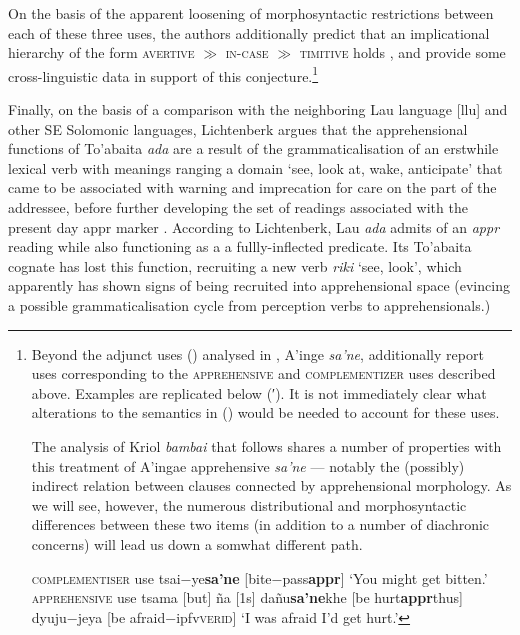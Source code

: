  On the basis of the apparent loosening of morphosyntactic restrictions between each of these three uses, the authors additionally predict that an implicational hierarchy of the form \textsc{avertive $\gg$ in-case $ \gg $ timitive} holds \citeyearpar[386-87]{AnderBois2020}, and provide some cross-linguistic data in support of this conjecture.\footnote{Beyond the adjunct uses () analysed in \citealt{AnderBois2020}, A'inge \textit{\textdblhyphen sa'ne}, \citet{Dabkowski} additionally report uses corresponding to the \textsc{apprehensive} and \textsc{complementizer} uses described above. Examples are replicated below (′). It is not immediately clear what alterations to the semantics in () would be needed to account for these uses.
	
The analysis of Kriol \textit{bambai} that follows shares a number of properties with this treatment of A'ingae apprehensive \textdblhyphen\textit{sa'ne} --- notably the (possibly) indirect relation between clauses connected by apprehensional morphology. As we will see, however, the numerous distributional and morphosyntactic differences between these two items (in addition to a number of diachronic concerns) will lead us down a somwhat different path.

\pex[glstyle=nlevel,aboveglftskip=.2ex,belowglpreambleskip=0ex,belowexskip=0ex,aboveexskip=1ex,exno=\getref{con}′]   
\a[label=d]\begingl\glpreamble\textsc{complementiser} use \endpreamble
tsai−ye\textdblhyphen\textbf{sa’ne} [bite−pass\textdblhyphen\textbf{\gls{appr}}]
\glft`You might get bitten.'
\endgl
\a[label=e]\begingl\glpreamble \textsc{apprehensive} use \endpreamble
tsama [but]
ña [1s]
dañu\textdblhyphen\textbf{sa'ne}\textdblhyphen khe [be hurt\textdblhyphen\textbf{\gls{appr}}\textdblhyphen thus]
dyuju−je\textdblhyphen ya [be afraid−\gls{ipfv}\textdblhyphen\textsc{verid}]
\glft`I was afraid I'd get hurt.'%
\endgl
\xe}



Finally, on the basis of a comparison with the neighboring Lau language [\gls{llu}] and other SE Solomonic languages, Lichtenberk argues that the apprehensional functions of To'abaita \textit{ada} are a result of the grammaticalisation of an erstwhile lexical verb with meanings ranging a domain `see, look at, wake, anticipate' that came to be associated with warning and imprecation for care on the part of the addressee, before further developing the set of readings associated with the present day {\sc appr} marker \citeyearpar[303-4]{Lichtenberk1995}. According to Lichtenberk, Lau \textit{ada} admits of an \textsl{appr} reading while also functioning as a a fullly-inflected predicate. Its To'abaita cognate has lost this function, recruiting a new verb \textit{riki} `see, look', which apparently has shown signs of being recruited into apprehensional space (evincing a possible grammaticalisation cycle from perception verbs to apprehensionals.)




